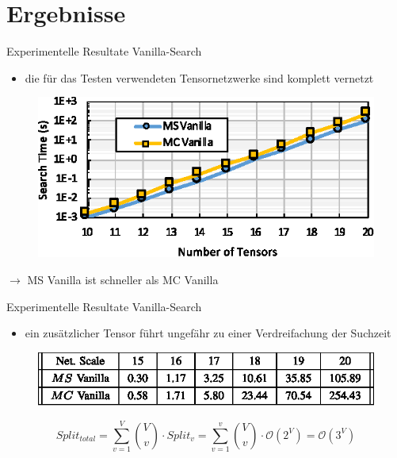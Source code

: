 \documentclass{beamer}
\begin{document}
\section{Ergebnisse}



\begin{frame}{Experimentelle Resultate Vanilla-Search}
	\begin{itemize}
		\item die für das Testen verwendeten Tensornetzwerke sind komplett vernetzt
	\end{itemize}
	\begin{figure}
		\includegraphics{figure_08}
	\end{figure} \pause
	$\rightarrow$ MS Vanilla ist schneller als MC Vanilla
\end{frame}

\begin{frame}{Experimentelle Resultate Vanilla-Search}
	\begin{itemize}
		\item ein zusätzlicher Tensor führt ungefähr zu einer Verdreifachung der Suchzeit
	\end{itemize}
	\begin{figure}
		\includegraphics{table_02}
	\end{figure}
	\begin{equation*}
		Split_{total} = \sum^V_{v=1} \binom{V}{v} \cdot Split_v = \sum^v_{v=1} \binom{V}{v} \cdot \mathcal{O} \left(2^V \right) = \mathcal{O} \left(3^V \right)
	\end{equation*}
\end{frame}
\end{document}
